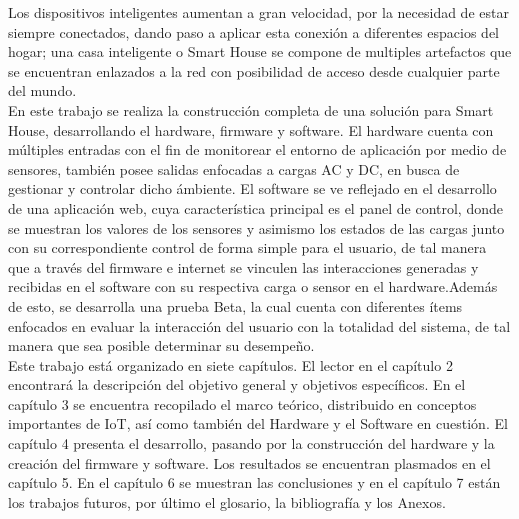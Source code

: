  Los dispositivos inteligentes aumentan a gran velocidad, por la necesidad de estar siempre conectados, dando paso a aplicar esta conexión a diferentes espacios del hogar; una casa inteligente o Smart House se compone de multiples artefactos que se encuentran enlazados a la red con posibilidad de acceso desde cualquier parte del mundo. \\
 
 En este trabajo se realiza la construcción completa de una solución para Smart House, desarrollando el hardware, firmware y software. El hardware cuenta con múltiples entradas con el fin de monitorear el entorno de aplicación por medio de sensores, también posee salidas enfocadas a cargas AC y DC, en busca de gestionar y controlar dicho ámbiente. El software se ve reflejado en el desarrollo de una aplicación web, cuya característica principal es el panel de control, donde se muestran los valores de los sensores y asimismo los estados de las cargas junto con su correspondiente control de forma simple para el usuario, de tal manera que a través del firmware e internet se vinculen las interacciones generadas y recibidas en el software con su respectiva carga o sensor en el hardware.Además de esto, se desarrolla una prueba Beta, la cual cuenta con diferentes ítems enfocados en evaluar la interacción del usuario con la totalidad del sistema, de tal manera que sea posible determinar su desempeño.\\
 
 Este trabajo está organizado en siete capítulos. El lector en el capítulo 2 encontrará la descripción del objetivo general y objetivos específicos. En el capítulo 3 se encuentra recopilado el marco teórico, distribuido en conceptos importantes de IoT, así como también del Hardware y el Software en cuestión. El capítulo 4 presenta el desarrollo, pasando por la construcción del hardware y la creación del firmware y software. Los resultados se encuentran plasmados en el capítulo 5. En el capítulo 6 se muestran las conclusiones y en el capítulo 7 están los trabajos futuros, por último el glosario, la bibliografía y los Anexos.\\
 
